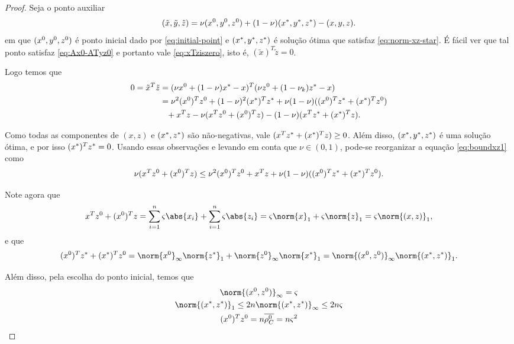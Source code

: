 \begin{proof}
	Seja o ponto auxiliar
	\[
		(\tilde{x},\tilde{y},\tilde{z})  = \nu(x^0,y^0,z^0) + (1-\nu)(x^*,y^*,z^*) - (x,y,z). 
	\]
em que $(x^0,y^0,z^0)$ é ponto inicial dado por \eqref{eq:initial-point} e $(x^*,y^*,z^*)$ é  solução ótima que satisfaz \eqref{eq:norm-xz-star}.
É fácil ver que tal ponto satisfaz \eqref{eq:Ax0-ATyz0} e portanto vale \eqref{eq:xTziszero}, isto é, $(\tilde{x})^{T}\tilde{z} = 0$. 

Logo temos que 
\begin{align}
	0  = \tilde{x}^{T}\tilde{z} & = (\nu\xzero + (1-\nu)\xstar - x)^{T}(\nu\zzero + (1-\nu_k)\zstar - x)\notag\\
	  & = \nu^{2}(\xzero)^T\zzero + (1-\nu)^{2}(\xstar)^{T}\zstar + \nu(1-\nu)((\xzero)^{T}\zstar + (\xstar)^{T}\zzero) \notag\\
	  & \textcolor{white}{=} + x^{T}z - \nu (x^{T}\zzero + (\xzero)^{T}z) - (1-\nu) (x^{T}\zstar + (\xstar)^{T}z).\label{eq:boundxz1}
\end{align}

Como todas as componentes de $(x,z)$ e $(x^*,z^*)$ são não-negativas, vale $(x^{T}z^* + (x^*)^{T}z) \geq 0$. Além disso, $(x^*,y^*,z^*)$ é uma solução ótima, e por isso $(x^*)^{T}z^* = 0$. Usando essas observações e levando em conta que $\nu\in(0,1)$,  pode-se reorganizar  a equação \eqref{eq:boundxz1} como
\begin{equation}
	\label{eq:xTzero+xzeroTz}
	  \nu (x^{T}z^0 + (x^0)^{T}z) \leq 
  \nu^{2}(x^0)^Tz^0  +  x^{T}z+  \nu(1-\nu)((x^0)^{T}z^* + (x^*)^{T}z^0).
\end{equation}

Note agora que 
\begin{equation}
\label{eq:normxz1}
	x^{T}\zzero + (\xzero)^{T}z = \sum_{i=1}^{n} \bdxzstar\abs{x_i} +\sum_{i=1}^{n} \bdxzstar\abs{z_i} = \bdxzstar\norm{x}_{1} + 
	\bdxzstar\norm{z}_{1} = \bdxzstar\norm{(x,z)}_{1},
\end{equation}
e que
\begin{equation}
\label{eq:norm-star-zero-infty-1}
	(\xzero)^{T}\zstar + (\xstar)^{T}\zzero  = \norm{\xzero}_{\infty}\norm{\zstar}_{1} + \norm{\zzero}_{\infty}\norm{\xstar}_{1}  = \norm{(\xzero,\zzero)}_{\infty}\norm{(\xstar,\zstar)}_{1}.
\end{equation}


Além disso, pela escolha do ponto inicial, temos que 
\begin{gather*}
	\norm{(\xzero,\zzero)}_\infty = \bdxzstar \label{eq:initial-conseq-a}\\
	\norm{(\xstar,\zstar)}_1\leq 2n\norm{(\xstar,\zstar)}_{\infty} \leq 2n \bdxzstar \label{eq:initial-conseq-b}\\
	(\xzero)^{T}\zzero = n\dbvec{\rho_C^0} = n\bdxzstar^{2}\label{eq:initial-conseq-c}
\end{gather*}


\end{proof}
